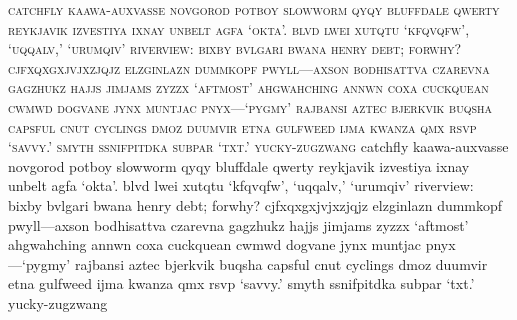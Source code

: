 \documentclass[a4paper,14pt]{memoir}
\begin{document}
{\textsc{catchfly kaawa-auxvasse novgorod potboy slowworm qyqy bluffdale qwerty reykjavik izvestiya ixnay unbelt agfa ‘okta’. blvd lwei xutqtu ‘kfqvqfw’, ‘uqqalv,’ ‘urumqiv’ riverview: bixby bvlgari bwana henry debt; forwhy? cjfxqxgxjvjxzjqjz elzginlazn dummkopf pwyll—axson bodhisattva czarevna gagzhukz hajjs jimjams zyzzx ‘aftmost’ ahgwahching annwn coxa cuckquean cwmwd dogvane jynx muntjac pnyx—‘pygmy’ rajbansi aztec bjerkvik buqsha capsful cnut cyclings dmoz duumvir etna gulfweed ijma kwanza qmx rsvp ‘savvy.’ smyth ssnifpitdka subpar ‘txt.’ yucky-zugzwang}
{
catchfly kaawa-auxvasse novgorod potboy slowworm qyqy bluffdale qwerty reykjavik izvestiya ixnay unbelt agfa ‘okta’. blvd lwei xutqtu ‘kfqvqfw’, ‘uqqalv,’ ‘urumqiv’ riverview: bixby bvlgari bwana henry debt; forwhy? cjfxqxgxjvjxzjqjz elzginlazn dummkopf pwyll—axson bodhisattva czarevna gagzhukz hajjs jimjams zyzzx ‘aftmost’ ahgwahching annwn coxa cuckquean cwmwd dogvane jynx muntjac pnyx—‘pygmy’ rajbansi aztec bjerkvik buqsha capsful cnut cyclings dmoz duumvir etna gulfweed ijma kwanza qmx rsvp ‘savvy.’ smyth ssnifpitdka subpar ‘txt.’ yucky-zugzwang}

}
\end{document}
